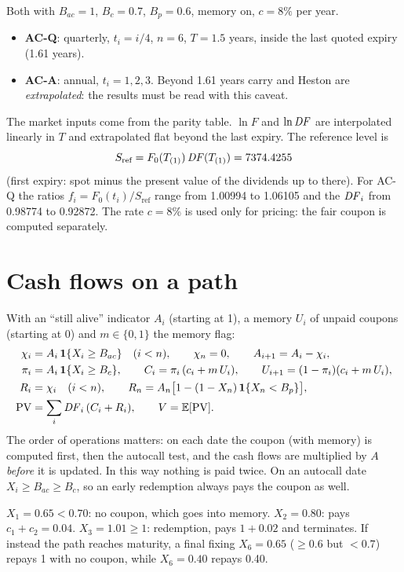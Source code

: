 \begin{progetto}[title={In the qpricer project: the two study term sheets}]
Both with $B_{ac}=1$, $B_c=0.7$, $B_p=0.6$, memory on, $c=8\%$ per year.
\begin{itemize}
\item \textbf{\mbox{AC-Q}}: quarterly, $t_i=i/4$, $n=6$, $T=1.5$ years, inside the last quoted expiry (1.61 years).
\item \textbf{\mbox{AC-A}}: annual, $t_i=1,2,3$. Beyond 1.61 years carry and Heston are \emph{extrapolated}: the
results must be read with this caveat.
\end{itemize}
The market inputs come from the parity table. $\ln F$ and $\ln\mathit{DF}$ are interpolated linearly in $T$ and extrapolated
flat beyond the last expiry. The reference level is
\[
S_{\text{ref}}=F_0(T_{(1)})\,\mathit{DF}(T_{(1)})=7374.4255
\]
(first expiry: spot minus the present value of the dividends up to there). For \mbox{AC-Q} the ratios
$f_i=F_0(t_i)/S_{\text{ref}}$ range from 1.00994 to 1.06105 and the $\mathit{DF}_i$ from 0.98774 to 0.92872. The rate $c=8\%$
is used only for pricing: the fair coupon is computed separately.
\end{progetto}

\section{Cash flows on a path}
With an ``still alive'' indicator $A_i$ (starting at 1), a memory $U_i$ of unpaid coupons (starting at 0) and
$m\in\{0,1\}$ the memory flag:
\begin{align}
\chi_i&=A_i\,\mathbf{1}\{X_i\ge B_{ac}\}\quad(i<n),\qquad\chi_n=0,\qquad A_{i+1}=A_i-\chi_i,\\
\pi_i&=A_i\,\mathbf{1}\{X_i\ge B_c\},\qquad C_i=\pi_i\,(c_i+m\,U_i),\qquad U_{i+1}=(1-\pi_i)(c_i+m\,U_i),\\
R_i&=\chi_i\quad(i<n),\qquad R_n=A_n\big[1-(1-X_n)\,\mathbf{1}\{X_n<B_p\}\big],\\
\mathrm{PV}&=\sum_i\mathit{DF}_i\,(C_i+R_i),\qquad V=\mathbb{E}[\mathrm{PV}].\label{eq:ac-pv}
\end{align}
The order of operations matters: on each date the coupon (with memory) is computed first, then the autocall test, and
the cash flows are multiplied by $A$ \emph{before} it is updated. In this way nothing is paid twice. On an autocall date
$X_i\ge B_{ac}\ge B_c$, so an early redemption always pays the coupon as well.

\begin{esempio}[title={\texorpdfstring{Example: a path by hand (\mbox{AC-Q}, $c_i=0.02$)}{Example: a path by hand
(AC-Q, c\_i=0.02)}}]
$X_1=0.65<0.70$: no coupon, which goes into memory. $X_2=0.80$: pays $c_1+c_2=0.04$. $X_3=1.01\ge1$: redemption, pays
$1+0.02$ and terminates. If instead the path reaches maturity, a final fixing $X_6=0.65$ ($\ge0.6$ but $<0.7$) repays 1
with no coupon, while $X_6=0.40$ repays 0.40.
\end{esempio}

